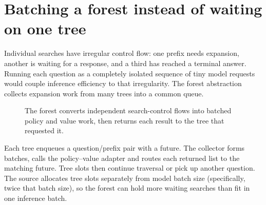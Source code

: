 \documentclass[11pt,letterpaper]{article}
\begin{document}
\section{Batching a forest instead of waiting on one tree}
Individual searches have irregular control flow: one prefix needs expansion, another is waiting for a response, and a third has reached a terminal answer. Running each question as a completely isolated sequence of tiny model requests would couple inference efficiency to that irregularity. The forest abstraction collects expansion work from many trees into a common queue.

\begin{figure}[ht]
\centering
\begin{publicationdiagram}
\end{publicationdiagram}
\caption{The forest converts independent search-control flows into batched policy and value work, then returns each result to the tree that requested it.}
\label{fig:forest}
\end{figure}

Each tree enqueues a question/prefix pair with a future. The collector forms batches, calls the policy--value adapter and routes each returned list to the matching future. Tree slots then continue traversal or pick up another question. The source allocates tree slots separately from model batch size (specifically, twice that batch size), so the forest can hold more waiting searches than fit in one inference batch.
\end{document}
